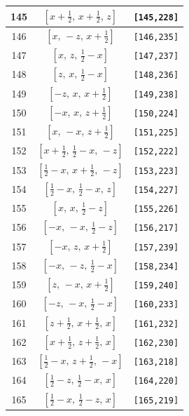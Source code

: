 \documentclass[fleqn,8pt]{jsarticle}
\begin{document}
\begin{longtable}{ccc}
145 & $\left[ x + \frac{1}{2},\, x + \frac{1}{2},\, z \right]$ & {\tt [145,228]} \\ \hline
146 & $\left[ x,\, - z,\, x + \frac{1}{2} \right]$ & {\tt [146,235]} \\ \hline
147 & $\left[ x,\, z,\, \frac{1}{2} - x \right]$ & {\tt [147,237]} \\ \hline
148 & $\left[ z,\, x,\, \frac{1}{2} - x \right]$ & {\tt [148,236]} \\ \hline
149 & $\left[ - z,\, x,\, x + \frac{1}{2} \right]$ & {\tt [149,238]} \\ \hline
150 & $\left[ - x,\, x,\, z + \frac{1}{2} \right]$ & {\tt [150,224]} \\ \hline
151 & $\left[ x,\, - x,\, z + \frac{1}{2} \right]$ & {\tt [151,225]} \\ \hline
152 & $\left[ x + \frac{1}{2},\, \frac{1}{2} - x,\, - z \right]$ & {\tt [152,222]} \\ \hline
153 & $\left[ \frac{1}{2} - x,\, x + \frac{1}{2},\, - z \right]$ & {\tt [153,223]} \\ \hline
154 & $\left[ \frac{1}{2} - x,\, \frac{1}{2} - x,\, z \right]$ & {\tt [154,227]} \\ \hline
155 & $\left[ x,\, x,\, \frac{1}{2} - z \right]$ & {\tt [155,226]} \\ \hline
156 & $\left[ - x,\, - x,\, \frac{1}{2} - z \right]$ & {\tt [156,217]} \\ \hline
157 & $\left[ - x,\, z,\, x + \frac{1}{2} \right]$ & {\tt [157,239]} \\ \hline
158 & $\left[ - x,\, - z,\, \frac{1}{2} - x \right]$ & {\tt [158,234]} \\ \hline
159 & $\left[ z,\, - x,\, x + \frac{1}{2} \right]$ & {\tt [159,240]} \\ \hline
160 & $\left[ - z,\, - x,\, \frac{1}{2} - x \right]$ & {\tt [160,233]} \\ \hline
161 & $\left[ z + \frac{1}{2},\, x + \frac{1}{2},\, x \right]$ & {\tt [161,232]} \\ \hline
162 & $\left[ x + \frac{1}{2},\, z + \frac{1}{2},\, x \right]$ & {\tt [162,230]} \\ \hline
163 & $\left[ \frac{1}{2} - x,\, z + \frac{1}{2},\, - x \right]$ & {\tt [163,218]} \\ \hline
164 & $\left[ \frac{1}{2} - z,\, \frac{1}{2} - x,\, x \right]$ & {\tt [164,220]} \\ \hline
165 & $\left[ \frac{1}{2} - x,\, \frac{1}{2} - z,\, x \right]$ & {\tt [165,219]} \\ \hline

\end{longtable}
\end{document}
